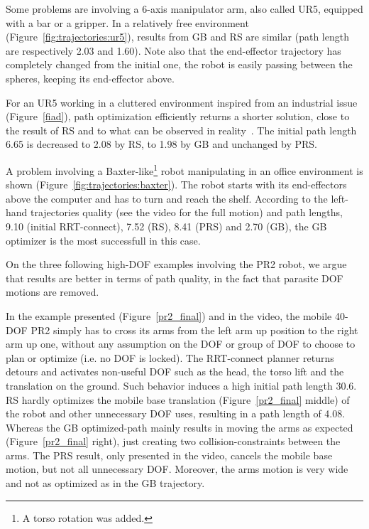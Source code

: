 \documentclass{tADR2e}
\begin{document}
Some problems are 
involving a 6-axis manipulator arm, also called UR5, equipped with a bar or a 
gripper.
In a relatively free environment (Figure~\ref{fig:trajectories:ur5}), 
results from GB and RS are similar (path length are respectively 2.03 and 1.60). 
Note also that the end-effector trajectory has completely changed from the initial 
one, the robot is easily passing between the spheres, keeping its end-effector 
above.

For an UR5 working in a cluttered environment inspired from an industrial issue 
(Figure~\ref{fiad}), path optimization efficiently returns a shorter solution, close 
to the result of RS and to what can be observed in reality~\cite{factory-day-video}. 
The initial path length 6.65 is decreased to 2.08 by RS, to 
1.98 by GB and unchanged by PRS.

A problem involving a Baxter-like\footnote{A torso rotation was added.} robot 
manipulating in an office environment is shown 
(Figure~\ref{fig:trajectories:baxter}). The robot starts with its end-effectors 
above the computer and has to 
turn and reach the shelf. According to the left-hand trajectories quality (see the 
video for the full motion) and path lengths, 9.10 (initial RRT-connect), 7.52 (RS), 
8.41 (PRS) and 2.70 (GB), the GB optimizer is the most successfull in this case.

\vspace{0.4cm}

On the three following high-DOF examples involving the PR2 robot, we argue that 
results are better in terms of path quality, in the fact that parasite DOF motions 
are removed.

In the example presented (Figure~\ref{pr2_final}) and in the video, the mobile 
40-DOF PR2 simply has to cross its arms from 
the left arm up position to the right arm up one, without any assumption on the DOF or group of DOF to choose to plan or optimize (i.e. no DOF is locked). 
The RRT-connect planner 
returns detours and activates non-useful DOF such as the head, the torso lift 
and the translation on the ground. Such behavior induces a high initial path length 
30.6. RS hardly optimizes the mobile base 
translation (Figure~\ref{pr2_final} middle) of the robot and other unnecessary DOF 
uses, resulting in a path length of 4.08.
Whereas the GB optimized-path mainly 
results in moving the arms as expected (Figure~\ref{pr2_final} right), just creating 
two collision-constraints between the arms. The PRS 
result, only presented in the video, cancels the mobile base motion, but not all 
unnecessary DOF. Moreover, the arms motion is very wide and not as optimized as in 
the GB trajectory.
\end{document}
